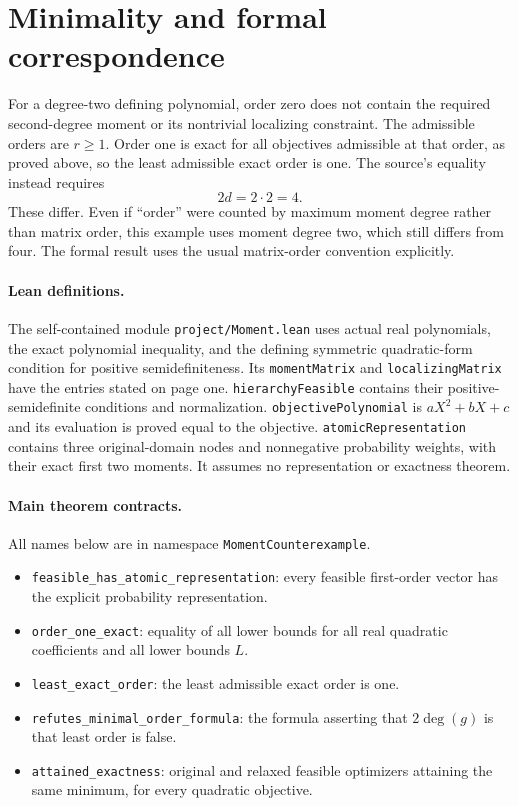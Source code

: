 \documentclass[11pt]{article}
\begin{document}
\newpage
\section*{Minimality and formal correspondence}
For a degree-two defining polynomial, order zero does not contain the required second-degree moment or its nontrivial localizing constraint. The admissible orders are $r\geq1$. Order one is exact for all objectives admissible at that order, as proved above, so the least admissible exact order is one. The source's equality instead requires
\[
2d=2\cdot2=4.
\]
These differ. Even if ``order'' were counted by maximum moment degree rather than matrix order, this example uses moment degree two, which still differs from four. The formal result uses the usual matrix-order convention explicitly.

\paragraph{Lean definitions.}
The self-contained module \texttt{project/Moment.lean} uses actual real polynomials, the exact polynomial inequality, and the defining symmetric quadratic-form condition for positive semidefiniteness. Its \texttt{momentMatrix} and \texttt{localizingMatrix} have the entries stated on page one. \texttt{hierarchyFeasible} contains their positive-semidefinite conditions and normalization. \texttt{objectivePolynomial} is $aX^2+bX+c$ and its evaluation is proved equal to the objective. \texttt{atomicRepresentation} contains three original-domain nodes and nonnegative probability weights, with their exact first two moments. It assumes no representation or exactness theorem.

\paragraph{Main theorem contracts.}
All names below are in namespace \texttt{MomentCounterexample}.
\begin{itemize}
\item \texttt{feasible\_has\_atomic\_representation}: every feasible first-order vector has the explicit probability representation.
\item \texttt{order\_one\_exact}: equality of all lower bounds for all real quadratic coefficients and all lower bounds $L$.
\item \texttt{least\_exact\_order}: the least admissible exact order is one.
\item \texttt{refutes\_minimal\_order\_formula}: the formula asserting that $2\deg(g)$ is that least order is false.
\item \texttt{attained\_exactness}: original and relaxed feasible optimizers attaining the same minimum, for every quadratic objective.
\end{itemize}
\end{document}
